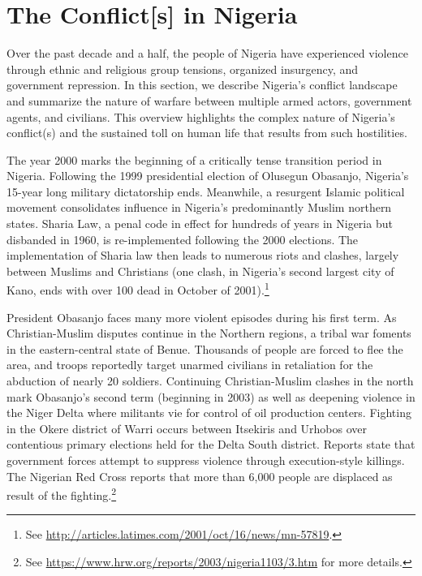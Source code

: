 \section*{The Conflict[s] in Nigeria}

Over the past decade and a half, the people of Nigeria have experienced violence through ethnic and religious group tensions, organized insurgency, and government repression. In this section, we describe Nigeria's conflict landscape and summarize the nature of warfare between multiple armed actors, government agents, and civilians. This overview highlights the complex nature of Nigeria's conflict(s) and the sustained toll on human life that results from such hostilities.

The year 2000 marks the beginning of a critically tense transition period in Nigeria. Following the 1999 presidential election of Olusegun Obasanjo, Nigeria's 15-year long military dictatorship ends. Meanwhile, a resurgent Islamic political movement consolidates influence in Nigeria's predominantly Muslim northern states. Sharia Law, a penal code in effect for hundreds of years in Nigeria but disbanded in 1960, is re-implemented following the 2000 elections. The implementation of Sharia law then leads to numerous riots and clashes, largely between Muslims and Christians (one clash, in Nigeria's second largest city of Kano, ends with over 100 dead in October of 2001).\footnote{See \url{http://articles.latimes.com/2001/oct/16/news/mn-57819}.}

President Obasanjo faces many more violent episodes during his first term. As Christian-Muslim disputes continue in the Northern regions, a tribal war foments in the eastern-central state of Benue. Thousands of people are forced to flee the area, and troops reportedly target unarmed civilians in retaliation for the abduction of nearly 20 soldiers. Continuing Christian-Muslim clashes in the north mark Obasanjo's second term (beginning in 2003) as well as deepening violence in the Niger Delta where militants vie for control of oil production centers. Fighting in the Okere district of Warri occurs between Itsekiris and Urhobos over contentious primary elections held for the Delta South district. Reports state that government forces attempt to suppress violence through execution-style killings. The Nigerian Red Cross reports that more than 6,000 people are displaced as result of the fighting.\footnote{See \url{https://www.hrw.org/reports/2003/nigeria1103/3.htm} for more details.}

